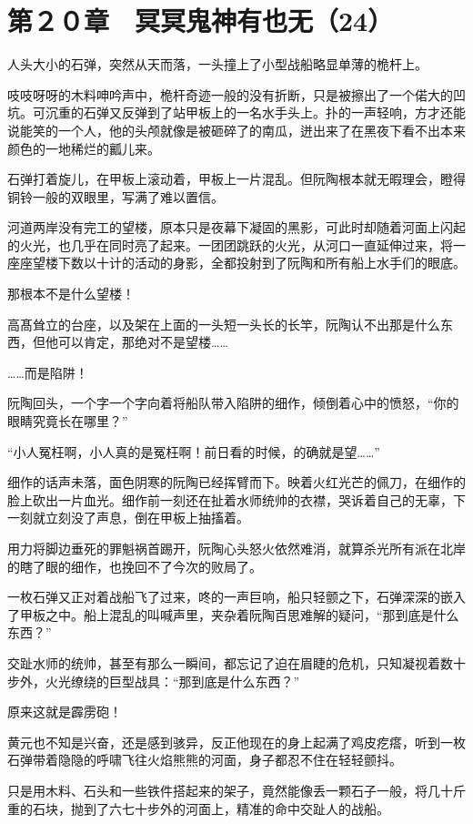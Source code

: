 \section{第２０章　冥冥鬼神有也无（24）}

人头大小的石弹，突然从天而落，一头撞上了小型战船略显单薄的桅杆上。

吱吱呀呀的木料呻吟声中，桅杆奇迹一般的没有折断，只是被擦出了一个偌大的凹坑。可沉重的石弹又反弹到了站甲板上的一名水手头上。扑的一声轻响，方才还能说能笑的一个人，他的头颅就像是被砸碎了的南瓜，迸出来了在黑夜下看不出本来颜色的一地稀烂的瓤儿来。

石弹打着旋儿，在甲板上滚动着，甲板上一片混乱。但阮陶根本就无暇理会，瞪得铜铃一般的双眼里，写满了难以置信。

河道两岸没有完工的望楼，原本只是夜幕下凝固的黑影，可此时却随着河面上闪起的火光，也几乎在同时亮了起来。一团团跳跃的火光，从河口一直延伸过来，将一座座望楼下数以十计的活动的身影，全都投射到了阮陶和所有船上水手们的眼底。

那根本不是什么望楼！

高髙耸立的台座，以及架在上面的一头短一头长的长竿，阮陶认不出那是什么东西，但他可以肯定，那绝对不是望楼……

……而是陷阱！

阮陶回头，一个字一个字向着将船队带入陷阱的细作，倾倒着心中的愤怒，“你的眼睛究竟长在哪里？”

“小人冤枉啊，小人真的是冤枉啊！前日看的时候，的确就是望……”

细作的话声未落，面色阴寒的阮陶已经挥臂而下。映着火红光芒的佩刀，在细作的脸上砍出一片血光。细作前一刻还在扯着水师统帅的衣襟，哭诉着自己的无辜，下一刻就立刻没了声息，倒在甲板上抽搐着。

用力将脚边垂死的罪魁祸首踢开，阮陶心头怒火依然难消，就算杀光所有派在北岸的瞎了眼的细作，也挽回不了今次的败局了。

一枚石弹又正对着战船飞了过来，咚的一声巨响，船只轻颤之下，石弹深深的嵌入了甲板之中。船上混乱的叫喊声里，夹杂着阮陶百思难解的疑问，“那到底是什么东西？”

交趾水师的统帅，甚至有那么一瞬间，都忘记了迫在眉睫的危机，只知凝视着数十步外，火光缭绕的巨型战具：“那到底是什么东西？”

原来这就是霹雳砲！

黄元也不知是兴奋，还是感到骇异，反正他现在的身上起满了鸡皮疙瘩，听到一枚石弹带着隐隐的呼啸飞往火焰熊熊的河面，身子都忍不住在轻轻颤抖。

只是用木料、石头和一些铁件搭起来的架子，竟然能像丢一颗石子一般，将几十斤重的石块，抛到了六七十步外的河面上，精准的命中交趾人的战船。

